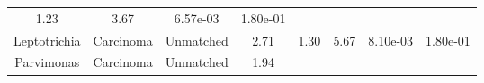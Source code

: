 \documentclass[12pt,]{article}
\begin{document}
\begin{longtable}[]{@{}cccccccc@{}}
\begin{minipage}[t]{0.13\columnwidth}
1.23\strut
\end{minipage} & \begin{minipage}[t]{0.13\columnwidth}\centering\strut
3.67\strut
\end{minipage} & \begin{minipage}[t]{0.07\columnwidth}\centering\strut
6.57e-03\strut
\end{minipage} & \begin{minipage}[t]{0.07\columnwidth}\centering\strut
1.80e-01\strut
\end{minipage}\tabularnewline
\begin{minipage}[t]{0.16\columnwidth}\centering\strut
Leptotrichia\strut
\end{minipage} & \begin{minipage}[t]{0.08\columnwidth}\centering\strut
Carcinoma\strut
\end{minipage} & \begin{minipage}[t]{0.09\columnwidth}\centering\strut
Unmatched\strut
\end{minipage} & \begin{minipage}[t]{0.05\columnwidth}\centering\strut
2.71\strut
\end{minipage} & \begin{minipage}[t]{0.13\columnwidth}\centering\strut
1.30\strut
\end{minipage} & \begin{minipage}[t]{0.13\columnwidth}\centering\strut
5.67\strut
\end{minipage} & \begin{minipage}[t]{0.07\columnwidth}\centering\strut
8.10e-03\strut
\end{minipage} & \begin{minipage}[t]{0.07\columnwidth}\centering\strut
1.80e-01\strut
\end{minipage}\tabularnewline
\begin{minipage}[t]{0.16\columnwidth}\centering\strut
Parvimonas\strut
\end{minipage} & \begin{minipage}[t]{0.08\columnwidth}\centering\strut
Carcinoma\strut
\end{minipage} & \begin{minipage}[t]{0.09\columnwidth}\centering\strut
Unmatched\strut
\end{minipage} & \begin{minipage}[t]{0.05\columnwidth}\centering\strut
1.94\strut
\end{minipage} & \begin{minipage}[t]{0.13\columnwidth}\centering\strut

\end{minipage}
\end{longtable}
\end{document}
